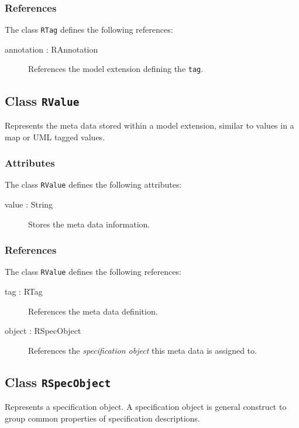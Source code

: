 \subsubsection{References}
The class \verb|RTag| defines the following references:
\begin{description}
	\item[annotation : RAnnotation] References the model extension defining the \verb|tag|.
\end{description}

\subsection{Class {\tt RValue}}
Represents the meta data stored within a model extension, similar to values in a map or UML tagged values.

\subsubsection{Attributes}
The class \verb|RValue| defines the following attributes:
\begin{description}
	\item[value : String] Stores the meta data information.
\end{description}

\subsubsection{References}
The class \verb|RValue| defines the following references:
\begin{description}
	\item[tag : RTag] References the meta data definition.
	\item[object : RSpecObject] References the \emph{specification object} this meta data is assigned to.
\end{description}

\subsection{Class {\tt RSpecObject}}
Represents a specification object.
A specification object is general construct to group common properties of specification descriptions.

